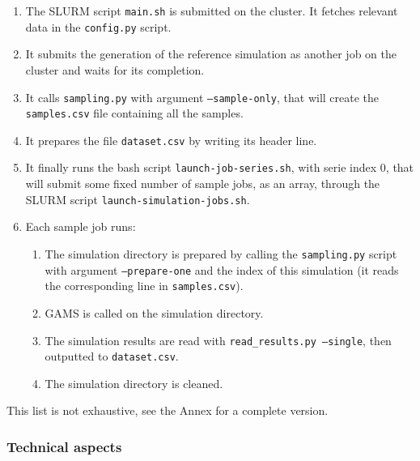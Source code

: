 \begin{enumerate}
    \item The SLURM script \texttt{main.sh} is submitted on the cluster. It fetches relevant data in the \texttt{config.py} script.
    \item It submits the generation of the reference simulation as another job on the cluster and waits for its completion.
    \item It calls \texttt{sampling.py} with argument \texttt{--sample-only}, that will create the \texttt{samples.csv} file containing all the samples.
    \item It prepares the file \texttt{dataset.csv} by writing its header line.
    \item It finally runs the bash script \texttt{launch-job-series.sh}, with serie index 0, that will submit some fixed number of sample jobs, as an array, through the SLURM script \texttt{launch-simulation-jobs.sh}.
    \item Each sample job runs:
    \begin{enumerate}
        \item The simulation directory is prepared by calling the \texttt{sampling.py} script with argument \texttt{--prepare-one} and the index of this simulation (it reads the corresponding line in \texttt{samples.csv}).
        \item GAMS is called on the simulation directory.
        \item The simulation results are read with \texttt{read\_results.py --single}, then outputted to \texttt{dataset.csv}.
        \item The simulation directory is cleaned.
    \end{enumerate}
\end{enumerate}

This list is not exhaustive, see the Annex for a complete version.

\subsubsection{Technical aspects}

